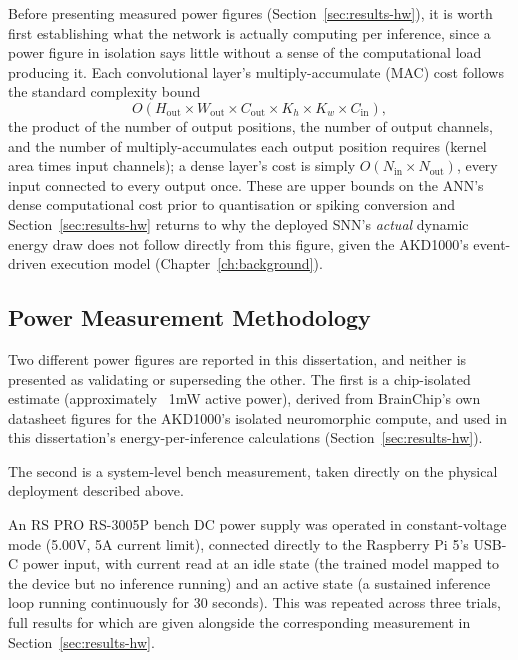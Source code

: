 Before presenting measured power figures (Section~\ref{sec:results-hw}), it is worth first establishing what the network is actually computing per inference, since a power figure in isolation says little without a sense of the computational load producing it. Each convolutional layer's multiply-accumulate (MAC) cost follows the standard complexity bound
\[
O(H_{\text{out}} \times W_{\text{out}} \times C_{\text{out}} \times K_h \times K_w \times C_{\text{in}}),
\]
the product of the number of output positions, the number of output channels, and the number of multiply-accumulates each output position requires (kernel area times input channels); a dense layer's cost is simply $O(N_{\text{in}} \times N_{\text{out}})$, every input connected to every output once. These are upper bounds on the ANN's dense computational cost prior to quantisation or spiking conversion and Section~\ref{sec:results-hw} returns to why the deployed SNN's \emph{actual} dynamic energy draw does not follow directly from this figure, given the AKD1000's event-driven execution model (Chapter~\ref{ch:background}).

\subsection{Power Measurement Methodology}

Two different power figures are reported in this dissertation, and neither is presented as validating or superseding the other. The first is a chip-isolated estimate 
(approximately ~1mW active power), derived from BrainChip's own datasheet figures for the AKD1000's isolated neuromorphic compute, and used in this dissertation's energy-per-inference 
calculations (Section~\ref{sec:results-hw}).

The second is a system-level bench measurement, taken directly on the physical deployment described above.


An RS PRO RS-3005P bench DC power supply was operated in constant-voltage mode (5.00V, 5A current limit), connected directly to the Raspberry Pi 5's USB-C power input, with current read at an idle state (the trained model mapped to the device but no inference running) and an active state (a sustained inference loop running continuously for 30 seconds). This was repeated across three trials, full results for which are given alongside the corresponding measurement in Section~\ref{sec:results-hw}.


